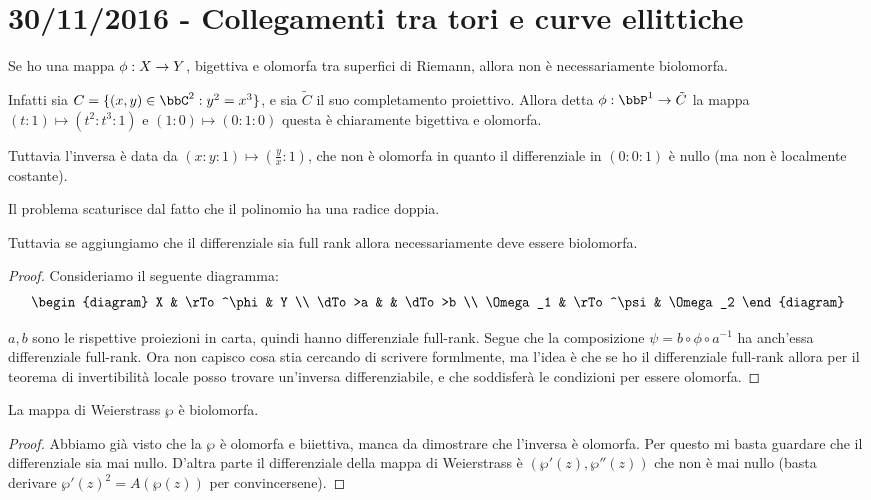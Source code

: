 \chapter{30/11/2016 - Collegamenti tra tori e curve ellittiche}
	Se ho una mappa $\phi: X \rightarrow Y$, bigettiva e olomorfa tra superfici di Riemann, allora non è necessariamente biolomorfa.
	
	Infatti sia $C = \{ (x,y) \in \bbC^2 : y^2=x^3 \}$, e sia $\tilde C$ il suo completamento proiettivo. Allora detta $\phi: \bbP^1 \rar \tilde C$ la mappa $ (t : 1) \mapsto (t^2 : t^3 : 1)$ e $(1 : 0) \mapsto (0:1:0)$ questa è chiaramente bigettiva e olomorfa.

	Tuttavia l'inversa è data da $(x:y:1) \mapsto (\frac yx:1)$, che non è olomorfa in quanto il differenziale in $(0:0:1)$ è nullo (ma non è localmente costante).
	
	Il problema scaturisce dal fatto che il polinomio ha una radice doppia.
	
	Tuttavia se aggiungiamo che il differenziale sia full rank allora necessariamente deve essere biolomorfa.
	\begin{proof}
		Consideriamo il seguente diagramma:
		\[
		\begin{diagram}
			X & \rTo^\phi & Y \\
			\dTo>a & & \dTo>b \\
			\Omega_1 & \rTo^\psi & \Omega_2
		\end{diagram}
		\]
		
		$a, b$ sono le rispettive proiezioni in carta, quindi hanno differenziale full-rank. Segue che la composizione $\psi = b\circ \phi \circ a^{-1}$ ha anch'essa differenziale full-rank.
		Ora non capisco cosa stia cercando di scrivere formlmente, ma l'idea è che se ho il differenziale full-rank allora per il teorema di invertibilità locale posso trovare un'inversa differenziabile, e che soddisferà le condizioni per essere olomorfa. %
	\end{proof}

	\begin{proposizione}
		La mappa di Weierstrass $\wp$ è biolomorfa. 
	\end{proposizione}
	\begin{proof}
		Abbiamo già visto che la $\wp$ è olomorfa e biiettiva, manca da dimostrare che l'inversa è olomorfa.
		Per questo mi basta guardare che il differenziale sia mai nullo. D'altra parte il differenziale della mappa di Weierstrass è $ (\wp'(z), \wp''(z))$ che non è mai nullo (basta derivare $\wp'(z)^2 = A(\wp(z))$ per convincersene).
	\end{proof}
	
